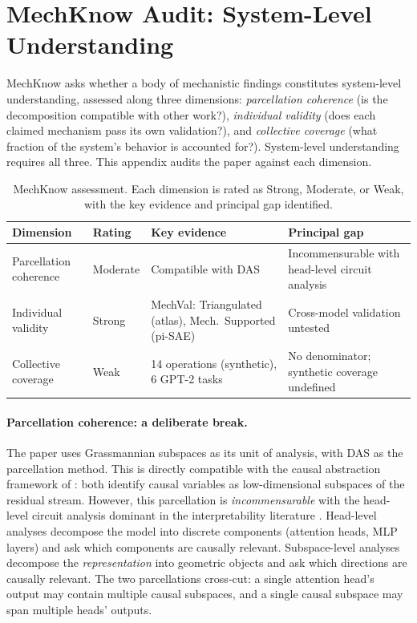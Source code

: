 
\section{MechKnow Audit: System-Level Understanding}
\label{app:mechknow}

MechKnow \citep{tower2026mechknowledge} asks whether a body of mechanistic
findings constitutes system-level understanding, assessed along three
dimensions: \emph{parcellation coherence} (is the decomposition compatible
with other work?), \emph{individual validity} (does each claimed mechanism
pass its own validation?), and \emph{collective coverage} (what fraction of
the system's behavior is accounted for?). System-level understanding requires
all three. This appendix audits the paper against each dimension.

\begin{table}[t]
\centering
\caption{MechKnow assessment. Each dimension is rated as Strong, Moderate, or
Weak, with the key evidence and principal gap identified.}
\label{tab:mechknow}
\small
\setlength{\tabcolsep}{3.5pt}
\begin{tabular}{@{}lllp{4.2cm}@{}}
\toprule
\textbf{Dimension} & \textbf{Rating} & \textbf{Key evidence} & \textbf{Principal gap} \\
\midrule
Parcellation coherence
  & Moderate
  & Compatible with DAS \citep{geiger2023finding}
  & Incommensurable with head-level circuit analysis \\
Individual validity
  & Strong
  & MechVal: Triangulated (atlas), Mech.\ Supported (pi-SAE)
  & Cross-model validation untested \\
Collective coverage
  & Weak
  & 14 operations (synthetic), 6 GPT-2 tasks
  & No denominator; synthetic coverage undefined \\
\bottomrule
\end{tabular}
\end{table}

\paragraph{Parcellation coherence: a deliberate break.}
The paper uses Grassmannian subspaces as its unit of analysis, with DAS as
the parcellation method. This is directly compatible with the causal
abstraction framework of \citet{geiger2021causal, geiger2023finding}: both
identify causal variables as low-dimensional subspaces of the residual
stream. However, this parcellation is \emph{incommensurable} with the
head-level circuit analysis dominant in the interpretability literature
\citep{wang2022interpretability, conmy2023automated}. Head-level analyses
decompose the model into discrete components (attention heads, MLP layers)
and ask which components are causally relevant. Subspace-level analyses
decompose the \emph{representation} into geometric objects and ask which
directions are causally relevant. The two parcellations cross-cut: a single
attention head's output may contain multiple causal subspaces, and a single
causal subspace may span multiple heads' outputs.

